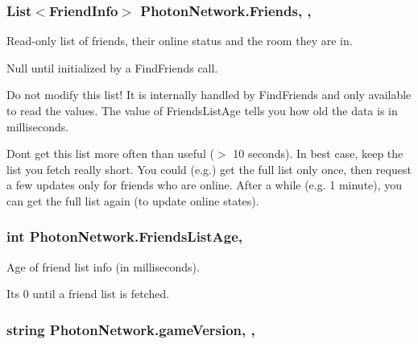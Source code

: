 \subsubsection[{\texorpdfstring{Friends}{Friends}}]{\setlength{\rightskip}{0pt plus 5cm}List$<${\bf Friend\+Info}$>$ Photon\+Network.\+Friends\hspace{0.3cm}{\ttfamily [static]}, {\ttfamily [get]}, {\ttfamily [set]}}\hypertarget{class_photon_network_afd22fd553d52fdc63e975c32ea47514f}{}\label{class_photon_network_afd22fd553d52fdc63e975c32ea47514f}


Read-\/only list of friends, their online status and the room they are in. 

Null until initialized by a Find\+Friends call. 

Do not modify this list! It is internally handled by Find\+Friends and only available to read the values. The value of Friends\+List\+Age tells you how old the data is in milliseconds.

Don\textquotesingle{}t get this list more often than useful ($>$ 10 seconds). In best case, keep the list you fetch really short. You could (e.\+g.) get the full list only once, then request a few updates only for friends who are online. After a while (e.\+g. 1 minute), you can get the full list again (to update online states). 
\subsubsection[{\texorpdfstring{Friends\+List\+Age}{FriendsListAge}}]{\setlength{\rightskip}{0pt plus 5cm}int Photon\+Network.\+Friends\+List\+Age\hspace{0.3cm}{\ttfamily [static]}, {\ttfamily [get]}}\hypertarget{class_photon_network_a5aca6d5aea9bb5b55967959d1ecd0ccd}{}\label{class_photon_network_a5aca6d5aea9bb5b55967959d1ecd0ccd}


Age of friend list info (in milliseconds). 

It\textquotesingle{}s 0 until a friend list is fetched. 
\subsubsection[{\texorpdfstring{game\+Version}{gameVersion}}]{\setlength{\rightskip}{0pt plus 5cm}string Photon\+Network.\+game\+Version\hspace{0.3cm}{\ttfamily [static]}, {\ttfamily [get]}, {\ttfamily [set]}}\hypertarget{class_photon_network_a2a8b1690325d73930d6bc8b99d8e736d}{}\label{class_photon_network_a2a8b1690325d73930d6bc8b99d8e736d}


